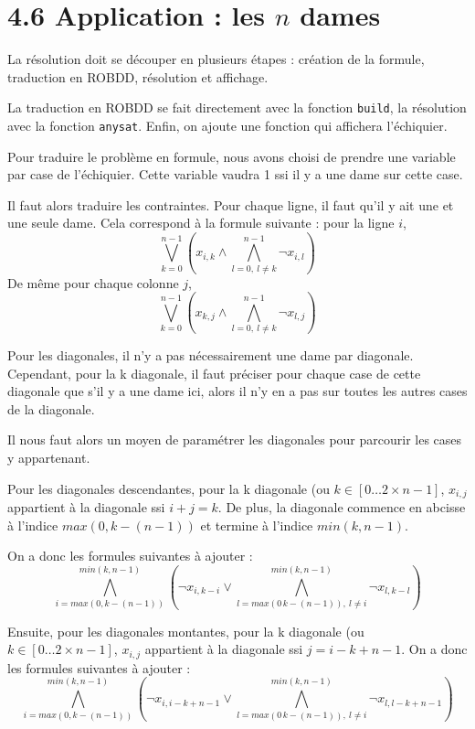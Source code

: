 \documentclass[12pt]{article}
\def\code#1{\texttt{#1}}
\begin{document}
\section*{4.6 Application : les $n$ dames}
La résolution doit se découper en plusieurs étapes : création de la formule, traduction en ROBDD, résolution et affichage.

La traduction en ROBDD se fait directement avec la fonction \code {build}, la résolution avec la fonction \code{anysat}. Enfin, on ajoute une fonction qui affichera l'échiquier.

Pour traduire le problème en formule, nous avons choisi de prendre une variable par case de l'échiquier. Cette variable vaudra 1 ssi il y a une dame sur cette case.

Il faut alors traduire les contraintes. Pour chaque ligne, il faut qu'il y ait une et une seule dame. Cela correspond à la formule suivante : 
pour la ligne $i$, 
$$\bigvee_{k=0}^{n-1} \left( x_{i,k}\wedge\bigwedge_{l=0,\ l\neq k}^{n-1} \neg x_{i,l}\right)$$
De même pour chaque colonne $j$, 
$$\bigvee_{k=0}^{n-1} \left( x_{k,j}\wedge\bigwedge_{l=0,\ l\neq k}^{n-1} \neg x_{l,j}\right)$$

Pour les diagonales, il n'y a pas nécessairement une dame par diagonale. Cependant, pour la k diagonale, il faut préciser pour chaque case de cette diagonale que s'il y a une dame ici, alors il n'y en a pas sur toutes les autres cases de la diagonale.

Il nous faut alors un moyen de paramétrer les diagonales pour parcourir les cases y appartenant.

Pour les diagonales descendantes, pour la k diagonale (ou $k\in[0\dots 2\times n-1]$, $x_{i,j}$ appartient à la diagonale ssi $i+j=k$. De plus, la diagonale commence en abcisse à l'indice $max(0,k-(n-1))$ et termine à l'indice $min(k,n-1)$. %

On a donc les formules suivantes à ajouter :
$$\bigwedge_{i=max(0,k-(n-1))}^{min(k,n-1)} \left( \neg x_{i, k-i} \vee\bigwedge_{l=max(0\,k-(n-1)),\ l\neq i}^{min(k,n-1)} \neg x_{l, k-l}\right)$$


Ensuite, pour les diagonales montantes, pour la k diagonale (ou $k\in[0\dots 2\times n-1]$, $x_{i,j}$ appartient à la diagonale ssi $j=i-k+n-1$. 
On a donc les formules suivantes à ajouter :
$$\bigwedge_{i=max(0,k-(n-1))}^{min(k,n-1)} \left( \neg x_{i, i-k+n-1} \vee\bigwedge_{l=max(0\,k-(n-1)),\ l\neq i}^{min(k,n-1)} \neg x_{l, l-k+n-1}\right)$$
\end{document}
